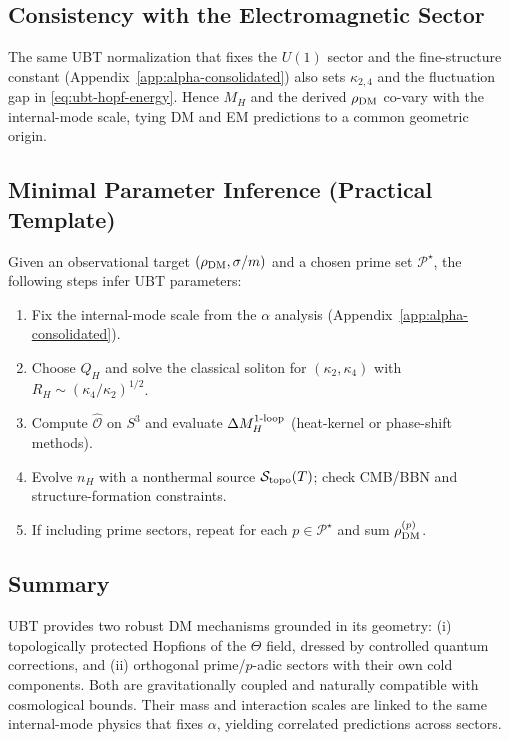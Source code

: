 \subsection{Consistency with the Electromagnetic Sector}
The same UBT normalization that fixes the $U(1)$ sector and the fine-structure constant (Appendix~\ref{app:alpha-consolidated}) also sets $\kappa_{2,4}$ and the fluctuation gap in \eqref{eq:ubt-hopf-energy}.
Hence $M_H$ and the derived $\rho_{\rm DM}$ co-vary with the internal-mode scale, tying DM and EM predictions to a common geometric origin.

\subsection{Minimal Parameter Inference (Practical Template)}
Given an observational target $(\rho_{\rm DM}, \sigma/m)$ and a chosen prime set $\mathcal{P}^\star$, the following steps infer UBT parameters:
\begin{enumerate}
\item Fix the internal-mode scale from the $\alpha$ analysis (Appendix~\ref{app:alpha-consolidated}).
\item Choose $Q_H$ and solve the classical soliton for $(\kappa_2,\kappa_4)$ with $R_H\!\sim\!(\kappa_4/\kappa_2)^{1/2}$.
\item Compute $\hat{\mathcal{O}}$ on $S^3$ and evaluate $\Delta M_H^{\rm 1\text{-}loop}$ (heat-kernel or phase-shift methods).
\item Evolve $n_H$ with a nonthermal source $\mathcal{S}_{\rm topo}(T)$; check CMB/BBN and structure-formation constraints.
\item If including prime sectors, repeat for each $p\in\mathcal{P}^\star$ and sum $\rho_{\rm DM}^{(p)}$.
\end{enumerate}

\subsection{Summary}
UBT provides two robust DM mechanisms grounded in its geometry: (i) topologically protected Hopfions of the $\Theta$ field, dressed by controlled quantum corrections, and (ii) orthogonal prime/$p$-adic sectors with their own cold components.
Both are gravitationally coupled and naturally compatible with cosmological bounds. Their mass and interaction scales are linked to the same internal-mode physics that fixes $\alpha$, yielding correlated predictions across sectors.
